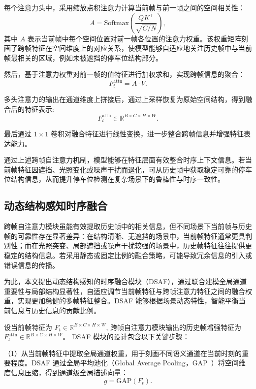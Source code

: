 每个注意力头中，采用缩放点积注意力计算当前帧与前一帧之间的空间相关性：
\begin{equation}
A = \mathrm{Softmax}(\frac{QK^{\top}}{\sqrt{C/N}}),
\end{equation}
其中 $A$ 表示当前帧中每个空间位置对前一帧各位置的注意力权重。该权重矩阵刻画了跨帧特征在空间维度上的对应关系，使模型能够自适应地关注历史帧中与当前帧最相关的区域，例如未被遮挡的停车位结构部分。

然后，基于注意力权重对前一帧的值特征进行加权求和，实现跨帧信息的聚合：
\begin{equation}
F_{t}^{\mathrm{attn}} = A \cdot V.
\end{equation}

多头注意力的输出在通道维度上拼接后，通过上采样恢复为原始空间结构，得到融合后的特征表示:
\begin{equation}
F_{t}^{\mathrm{attn}} \in \mathbb{R}^{B \times C \times H \times W}.
\end{equation}

最后通过 $1\times1$ 卷积对融合特征进行线性变换，进一步整合跨帧信息并增强特征表达能力。

通过上述跨帧自注意力机制，模型能够在特征层面有效整合时序上下文信息。若当前帧特征因遮挡、光照变化或噪声干扰而退化，可从历史帧中获取稳定可靠的停车位结构信息，从而提升停车位检测在复杂场景下的鲁棒性与时序一致性。


\subsection{动态结构感知时序融合}
跨帧自注意力模块虽能有效提取历史帧中的相关信息，但不同场景下当前帧与历史帧的可靠性存在显著差异：在结构清晰、无遮挡的场景中，当前帧特征通常更具判别性；而在光照突变、局部遮挡或噪声干扰较强的场景中，历史帧特征往往提供更稳定的结构信息。若采用静态或固定比例的融合策略，可能导致冗余信息的引入或错误信息的传播。

为此，本文提出动态结构感知的时序融合模块（DSAF），通过联合建模全局通道重要性与局部结构显著性，自适应调节当前帧特征与跨帧注意力特征之间的融合权重，实现更加稳健的多帧特征整合。DSAF 能够根据场景动态特性，智能平衡当前信息与历史信息的贡献比例。

设当前帧特征为
$F_t \in \mathbb{R}^{B \times C \times H \times W}$,
跨帧自注意力模块输出的历史帧增强特征为
$F_{t}^{\text{attn}} \in \mathbb{R}^{B \times C \times H \times W}$。
DSAF 模块的设计包含以下关键步骤：

（1）从当前帧特征中提取全局通道权重，用于刻画不同语义通道在当前时刻的重要程度。DSAF 通过全局平均池化（Global Average Pooling，GAP~\cite{lin2013network}）将空间维度信息压缩，得到通道级全局描述向量：
\begin{equation}
g = \text{GAP}(F_t).
\end{equation}

